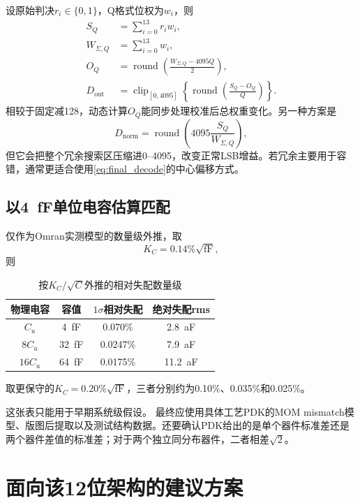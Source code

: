 \documentclass[UTF8,a4paper,11pt]{ctexart}
\newcommand{\clip}{\operatorname{clip}}
\newcommand{\round}{\operatorname{round}}
\begin{document}
设原始判决$r_i\in\{0,1\}$，Q格式位权为$w_i$，则
\begin{align}
S_Q&=\sum_{i=0}^{13}r_iw_i,\\
W_{\Sigma,Q}&=\sum_{i=0}^{13}w_i,\\
O_Q&=\round\left(\frac{W_{\Sigma,Q}-4095Q}{2}\right),\\
D_{\mathrm{out}}&=
\clip_{[0,4095]}\left\{
\round\left(\frac{S_Q-O_Q}{Q}\right)
\right\}.
\label{eq:final_decode}
\end{align}
相较于固定减128，动态计算$O_Q$能同步处理校准后总权重变化。另一种方案是
\begin{equation}
D_{\mathrm{norm}}=\round\left(4095\frac{S_Q}{W_{\Sigma,Q}}\right),
\end{equation}
但它会把整个冗余搜索区压缩进0--4095，改变正常LSB增益。若冗余主要用于容错，通常更适合使用\cref{eq:final_decode}的中心偏移方式。

\subsection{以\SI{4}{fF}单位电容估算匹配}

仅作为Omran实测模型的数量级外推，取
\begin{equation}
K_C=0.14\%\sqrt{\mathrm{fF}},
\end{equation}
则
\begin{table}[H]
\centering
\caption{按$K_C/\sqrt C$外推的相对失配数量级}
\begin{tabular}{cccc}
\toprule
物理电容 & 容值 & $1\sigma$相对失配 & 绝对失配rms\\
\midrule
$C_u$ & \SI{4}{fF} & 0.070\% & \SI{2.8}{aF}\\
$8C_u$ & \SI{32}{fF} & 0.0247\% & \SI{7.9}{aF}\\
$16C_u$ & \SI{64}{fF} & 0.0175\% & \SI{11.2}{aF}\\
\bottomrule
\end{tabular}
\end{table}
取更保守的$K_C=0.20\%\sqrt{\mathrm{fF}}$，三者分别约为0.10\%、0.035\%和0.025\%。

\begin{warnbox}{这张表只能用于早期系统级假设。}
最终应使用具体工艺PDK的MOM mismatch模型、版图后提取以及测试结构数据。还要确认PDK给出的是单个器件标准差还是两个器件差值的标准差；对于两个独立同分布器件，二者相差$\sqrt2$。
\end{warnbox}

\section{面向该12位架构的建议方案}
\end{document}

